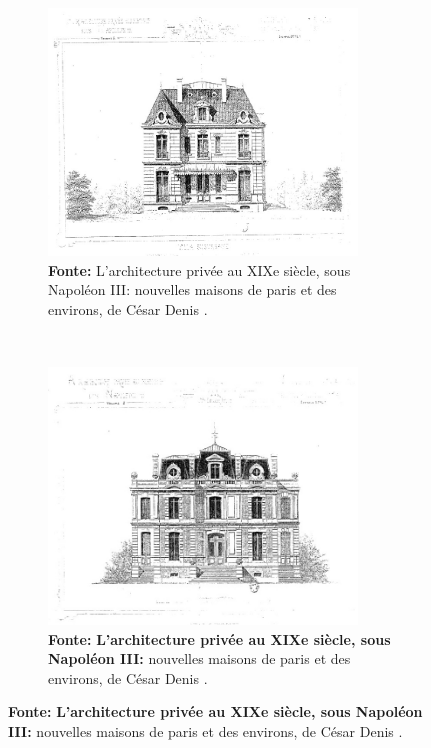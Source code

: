 \begin{figure}[!htp]
\centering
\caption{\textit{Villas suburbaines} de segunda classe no estilo Segundo Império/Napoleão III.}
\begin{subfigure}[b]{0.8\linewidth}
\includegraphics[width=0.9\textwidth]{2-cap1/complementos/fotos/daly03-5.JPEG}
\caption{\textbf{Fonte:} L’architecture privée au XIXe siècle, sous Napoléon III: nouvelles maisons de paris et des environs, de César Denis .}
\label{fig:villasegclas1}
\end{subfigure}
\
\begin{subfigure}[b]{0.8\linewidth}
\includegraphics[width=0.9\textwidth]{2-cap1/complementos/fotos/daly03-6.JPEG}
\caption{\textbf{Fonte:} \textbf{L’architecture privée au XIXe siècle, sous Napoléon III:} nouvelles maisons de paris et des environs, de César Denis .}
\label{fig:villasegclas2}
\end{subfigure}
\end{figure}

